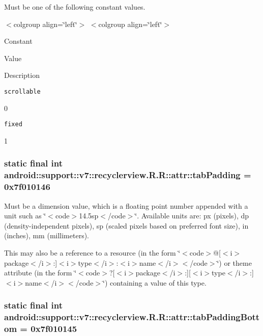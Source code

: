 Must be one of the following constant values. \begin{TabularC}{0}
\hline
\end{TabularC}
$<$colgroup align=\char`\"{}left\char`\"{}$>$ $<$colgroup align=\char`\"{}left\char`\"{}$>$ 

Constant

Value

Description 

{\tt scrollable}

0

{\tt fixed}

1\hypertarget{classandroid_1_1support_1_1v7_1_1recyclerview_1_1_r_1_1attr_c83f27a23b7611591430d3d7945b84d3}{
\subsubsection[{tabPadding}]{\setlength{\rightskip}{0pt plus 5cm}static final int android::support::v7::recyclerview.R.R::attr::tabPadding = 0x7f010146}}
\label{classandroid_1_1support_1_1v7_1_1recyclerview_1_1_r_1_1attr_c83f27a23b7611591430d3d7945b84d3}


Must be a dimension value, which is a floating point number appended with a unit such as \char`\"{}$<$code$>$14.5sp$<$/code$>$\char`\"{}. Available units are: px (pixels), dp (density-independent pixels), sp (scaled pixels based on preferred font size), in (inches), mm (millimeters). 

This may also be a reference to a resource (in the form \char`\"{}$<$code$>$@\mbox{[}$<$i$>$package$<$/i$>$:\mbox{]}$<$i$>$type$<$/i$>$:$<$i$>$name$<$/i$>$$<$/code$>$\char`\"{}) or theme attribute (in the form \char`\"{}$<$code$>$?\mbox{[}$<$i$>$package$<$/i$>$:\mbox{]}\mbox{[}$<$i$>$type$<$/i$>$:\mbox{]}$<$i$>$name$<$/i$>$$<$/code$>$\char`\"{}) containing a value of this type. \hypertarget{classandroid_1_1support_1_1v7_1_1recyclerview_1_1_r_1_1attr_cd28d1d76eb236974f7608664748832c}{
\subsubsection[{tabPaddingBottom}]{\setlength{\rightskip}{0pt plus 5cm}static final int android::support::v7::recyclerview.R.R::attr::tabPaddingBottom = 0x7f010145}}
\label{classandroid_1_1support_1_1v7_1_1recyclerview_1_1_r_1_1attr_cd28d1d76eb236974f7608664748832c}


